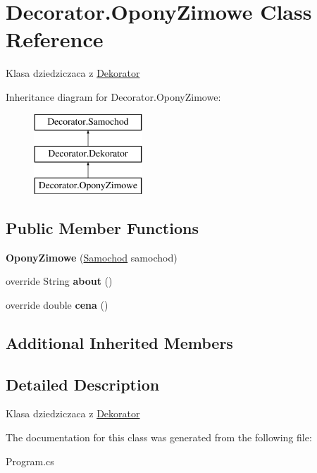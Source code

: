 \hypertarget{class_decorator_1_1_opony_zimowe}{}\section{Decorator.\+Opony\+Zimowe Class Reference}
\label{class_decorator_1_1_opony_zimowe}


Klasa dziedziczaca z \hyperlink{class_decorator_1_1_dekorator}{Dekorator}  


Inheritance diagram for Decorator.\+Opony\+Zimowe\+:\begin{figure}[H]
\begin{center}
\leavevmode
\includegraphics[height=3.000000cm]{class_decorator_1_1_opony_zimowe}
\end{center}
\end{figure}
\subsection*{Public Member Functions}
\begin{DoxyCompactItemize}
\item 
\mbox{\label{class_decorator_1_1_opony_zimowe_aa3e242dd62668d4c803d22ab7371ebcc}} 
{\bfseries Opony\+Zimowe} (\hyperlink{class_decorator_1_1_samochod}{Samochod} samochod)
\item 
\mbox{\label{class_decorator_1_1_opony_zimowe_aa4aef4edfce638b708e069eb23787e99}} 
override String {\bfseries about} ()
\item 
\mbox{\label{class_decorator_1_1_opony_zimowe_a2fc76a06de0b8a57aa908cc4e589e861}} 
override double {\bfseries cena} ()
\end{DoxyCompactItemize}
\subsection*{Additional Inherited Members}


\subsection{Detailed Description}
Klasa dziedziczaca z \hyperlink{class_decorator_1_1_dekorator}{Dekorator} 



The documentation for this class was generated from the following file\+:\begin{DoxyCompactItemize}
\item 
Program.\+cs\end{DoxyCompactItemize}
